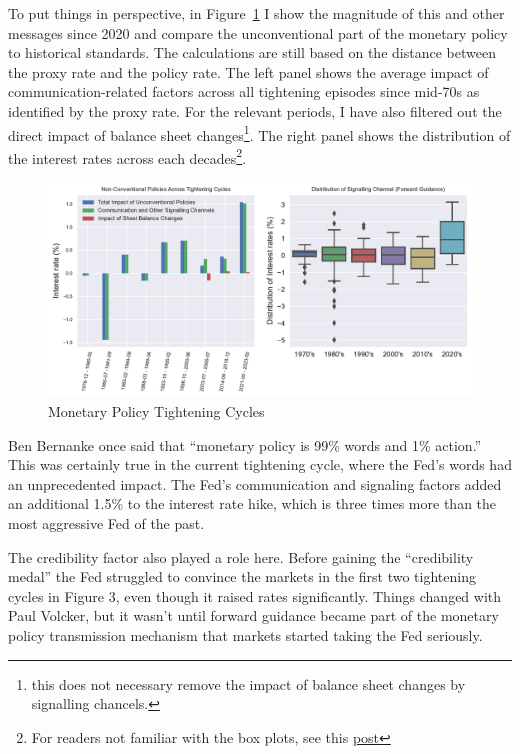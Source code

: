 \documentclass[
  letterpaper,
  DIV=11,
  numbers=noendperiod]{scrartcl}
\begin{document}
To put things in perspective, in Figure~\ref{fig-3} I show the magnitude
of this and other messages since 2020 and compare the unconventional
part of the monetary policy to historical standards. The calculations
are still based on the distance between the proxy rate and the policy
rate. The left panel shows the average impact of communication-related
factors across all tightening episodes since mid-70s as identified by
the proxy rate. For the relevant periods, I have also filtered out the
direct impact of balance sheet changes\footnote{this does not necessary
  remove the impact of balance sheet changes by signalling chancels.}.
The right panel shows the distribution of the interest rates across each
decades\footnote{For readers not familiar with the box plots, see this
  \href{https://en.wikipedia.org/wiki/Box_plot}{post}}.

\begin{figure}

{\centering \includegraphics{Hawkish_Fed_files/figure-pdf/fig-3-output-1.pdf}

}

\caption{\label{fig-3}Monetary Policy Tightening Cycles}

\end{figure}

Ben Bernanke once said that ``monetary policy is 99\% words and 1\%
action.'' This was certainly true in the current tightening cycle, where
the Fed's words had an unprecedented impact. The Fed's communication and
signaling factors added an additional 1.5\% to the interest rate hike,
which is three times more than the most aggressive Fed of the past.

The credibility factor also played a role here. Before gaining the
``credibility medal'' the Fed struggled to convince the markets in the
first two tightening cycles in Figure 3, even though it raised rates
significantly. Things changed with Paul Volcker, but it wasn't until
forward guidance became part of the monetary policy transmission
mechanism that markets started taking the Fed seriously.
\end{document}
